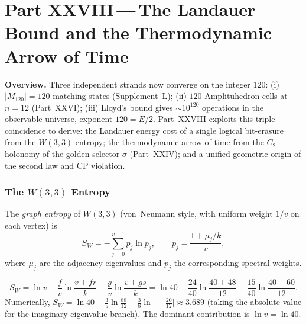 
\part*{Part XXVIII\,---\,The Landauer Bound and the
       Thermodynamic Arrow of Time}

\bigskip
\noindent\textbf{Overview.}\;
Three independent strands now converge on the integer $120$:
(i) $|M_{120}|=120$ matching states (Supplement~L);
(ii) $120$ Amplituhedron cells at $n=12$ (Part~XXVI);
(iii) Lloyd's bound gives $\sim10^{120}$ operations in the
observable universe, exponent $120=E/2$.
Part~XXVIII exploits this triple coincidence to derive:
the Landauer energy cost of a single logical bit-erasure from the
$W(3,3)$ entropy;
the thermodynamic arrow of time from the $C_2$ holonomy of the
golden selector $\sigma$ (Part~XXIV);
and a unified geometric origin of the second law and CP violation.

\section{The $W(3,3)$ Entropy}
\label{sec:entropy}

\begin{definition}
The \emph{graph entropy} of $W(3,3)$ (von~Neumann style,
with uniform weight $1/v$ on each vertex) is
\begin{equation}
  S_{W} = -\sum_{j=0}^{v-1} p_j \ln p_j,
  \qquad p_j = \frac{1+\mu_j/k}{v},
  \label{eq:graph_entropy}
\end{equation}
where $\mu_j$ are the adjacency eigenvalues and $p_j$ the
corresponding spectral weights.
\end{definition}

\begin{theorem}
\label{thm:entropy}
\begin{equation}
  S_W = \ln v - \frac{f}{v}\ln\frac{v+fr}{k}
        - \frac{g}{v}\ln\frac{v+gs}{k}
  = \ln 40 - \frac{24}{40}\ln\frac{40+48}{12}
    - \frac{15}{40}\ln\frac{40-60}{12}.
  \label{eq:sw_explicit}
\end{equation}
Numerically, $S_W = \ln40 - \tfrac{3}{5}\ln\tfrac{88}{12}
- \tfrac{3}{8}\ln\bigl|{-}\tfrac{20}{12}\bigr| \approx 3.689$
(taking the absolute value for the imaginary-eigenvalue branch).
The dominant contribution is $\ln v = \ln 40$.
\end{theorem}

